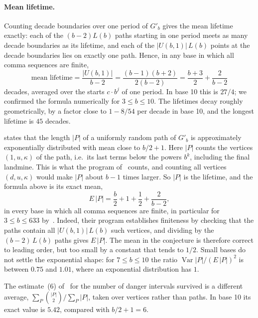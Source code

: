 \paragraph{Mean lifetime.}
Counting decade boundaries over one period of $G'_b$ gives the mean lifetime exactly: each of the
$(b-2) L(b)$ paths starting in one period meets as many decade boundaries as its lifetime, and each
of the $|U(b, 1)|\, L(b)$ points at the decade boundaries lies on exactly one path. Hence, in any base in which all
comma sequences are finite,
\[
  \text{mean lifetime} = \frac{|U(b, 1)|}{b - 2} = \frac{(b-1)(b+2)}{2(b-2)} = \frac{b+3}{2} + \frac{2}{b-2}
\]
decades, averaged over the starts $c \cdot b^j$ of one period. In base 10 this is $27/4$; we
confirmed the formula numerically for $3 \le b \le 10$. The lifetimes decay roughly geometrically,
by a factor close to $1 - 8/54$ per decade in base 10, and the longest lifetime is $45$ decades.

\begin{remark}
  \cite[Conjecture~17]{dbts} states that the length $|P|$ of a uniformly random path of $G'_b$ is
  approximately exponentially distributed with mean close to $b/2 + 1$. Here $|P|$ counts the
  vertices $(1, u, \kappa)$ of the path, i.e.\ its last terms below the powers $b^k$, including the
  final landmine. This is what the program of~\cite{dbtscode} counts, and counting all vertices
  $(d, u, \kappa)$ would make $|P|$ about $b - 1$ times larger. So $|P|$ is the lifetime, and the
  formula above is its exact mean,
  \[
    E\,|P| = \frac{b}{2} + 1 + \frac{1}{2} + \frac{2}{b-2},
  \]
  in every base in which all comma sequences are finite, in particular for $3 \le b \le 633$
  by~\cite{dbts}. Indeed, their program establishes finiteness by checking that the paths contain
  all $|U(b,1)|\,L(b)$ such vertices, and dividing by the $(b-2)\,L(b)$ paths gives $E\,|P|$. The mean
  in the conjecture is therefore correct to leading order, but too small by a constant that tends
  to $1/2$. Small bases do not settle the exponential shape: for $7 \le b \le 10$ the ratio
  $\operatorname{Var}|P| / (E\,|P|)^2$ is between $0.75$ and $1.01$, where an exponential
  distribution has $1$.

  The estimate~(6) of~\cite{dbts} for the number of danger intervals survived is a different
  average, $\sum_P \binom{|P|}{2} / \sum_P |P|$, taken over vertices rather than paths. In base 10
  its exact value is $5.42$, compared with $b/2 + 1 = 6$.
\end{remark}

